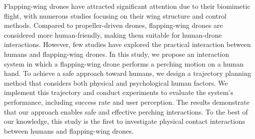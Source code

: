 Flapping-wing drones have attracted significant attention due to their biomimetic flight, with numerous studies focusing on their wing structure and control methods. 
Compared to propeller-driven drones, flapping-wing drones are considered more human-friendly, making them suitable for human-drone interactions. 
However, few studies have explored the practical interaction between humans and flapping-wing drones. 
In this study, we propose an interaction system in which a flapping-wing drone performs a perching motion on a human hand. 
To achieve a safe approach toward humans, we design a trajectory planning method that considers both physical and psychological human factors. 
We implement this trajectory and conduct experiments to evaluate the system’s performance, including success rate and user perception. 
The results demonstrate that our approach enables safe and effective perching interactions. 
To the best of our knowledge, this study is the first to investigate physical contact interactions between humans and flapping-wing drones.
